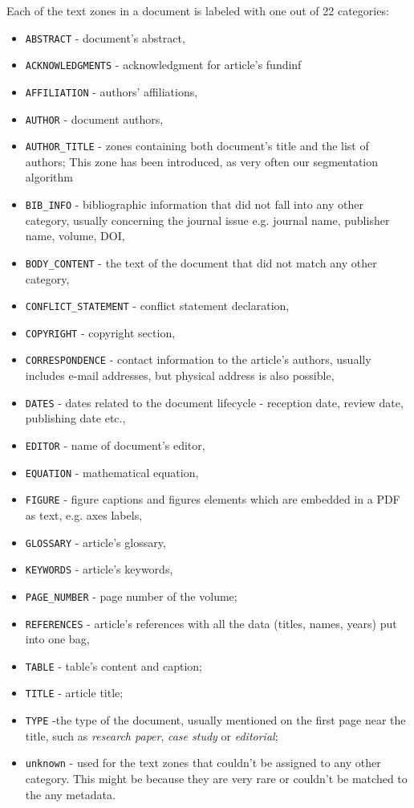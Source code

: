 Each of the text zones in a document is labeled with one out of 22 categories:
\begin{itemize}
    \item \verb+ABSTRACT+ - document's abstract,
    \item \verb+ACKNOWLEDGMENTS+ - acknowledgment for article's fundinf
    \item \verb+AFFILIATION+ - authors' affiliations,
    \item \verb+AUTHOR+ - document authors,
    \item \verb+AUTHOR_TITLE+ - zones containing both document's title and the list of authors; This zone has been introduced, as very often our segmentation algorithm 
    \item \verb+BIB_INFO+ - bibliographic information that did not fall into any other category, usually concerning the journal issue e.g. journal name, publisher name, volume, DOI,
    \item \verb+BODY_CONTENT+ - the text of the document that did not match any other category,
    \item \verb+CONFLICT_STATEMENT+ - conflict statement declaration,
    \item \verb+COPYRIGHT+ - copyright section,
    \item \verb+CORRESPONDENCE+ - contact information to the article's authors, usually includes e-mail addresses, but physical address is also possible,
    \item \verb+DATES+ - dates related to the document lifecycle - reception date, review date, publishing date etc.,
    \item \verb+EDITOR+ - name of document's editor,
    \item \verb+EQUATION+ - mathematical equation,
    \item \verb+FIGURE+ - figure captions and figures elements which are embedded in a PDF as text, e.g. axes labels,
    \item \verb+GLOSSARY+ - article's glossary,
    \item \verb+KEYWORDS+ - article's keywords,
    \item \verb+PAGE_NUMBER+ - page number of the volume;
    \item \verb+REFERENCES+ - article's references with all the data (titles, names, years) put into one bag,
    \item \verb+TABLE+ - table's content and caption;
    \item \verb+TITLE+ - article title;
    \item \verb+TYPE+ -the type of the document, usually mentioned on the first page near the title, such as \textit{research paper}, \textit{case study} or \textit{editorial};
    \item \verb+unknown+ - used for the text zones that couldn't be assigned to any other category. This might be because they are very rare or couldn't be matched to the any metadata.
\end{itemize}

